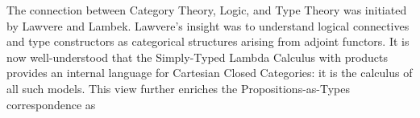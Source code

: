 \documentclass[11pt,twocolumn]{article}
\begin{document}
The connection between Category Theory, Logic, and Type Theory was
initiated by Lawvere %
and Lambek. %
%
Lawvere's insight was to understand logical connectives and type
constructors as categorical structures arising from 
adjoint functors. %
%
It
is now well-understood that the Simply-Typed Lambda Calculus with products
provides an internal language for Cartesian Closed Categories: %
it is the calculus of all such models.  This view further enriches the
Propositions-as-Types correspondence as 
\end{document}

